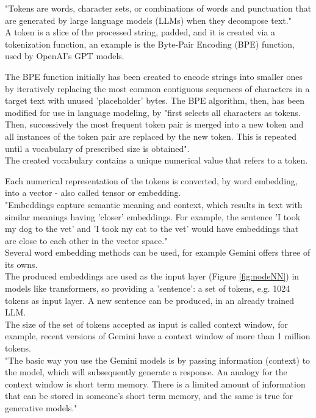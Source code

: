 \documentclass[12pt]{article}
\begin{document}
\vspace{2mm}

"Tokens are words, character sets, or combinations of words and punctuation that are generated by large language models (LLMs) when they decompose text."\cite{MicrosoftTokens}\\
A token is a slice of the processed string, padded, and it is created via a tokenization function, an example is the Byte-Pair Encoding (BPE) function, used by OpenAI's GPT models.

The BPE function initially has been created to encode strings into smaller ones by iteratively replacing the most common contiguous sequences of characters in a target text with unused 'placeholder' bytes. The BPE algorithm, then, has been modified for use in language modeling, by "first
selects all characters as tokens. Then, successively the most frequent token pair is
merged into a new token and all instances of the token pair are replaced by the
new token. This is repeated until a vocabulary of prescribed size is obtained".\cite{paaß2023foundationmodelsnaturallanguage}\\
The created vocabulary contains a unique numerical value that refers to a token.\\

\vspace{2mm}

Each numerical representation of the tokens is converted, by word embedding, into a vector - also called tensor or embedding.\\
"Embeddings capture semantic meaning and context, which results in text with similar meanings having 'closer' embeddings. For example, the sentence 'I took my dog to the vet' and 'I took my cat to the vet' would have embeddings that are close to each other in the vector space."\cite{GoogleEmbeddings}\\
Several word embedding methods can be used, for example Gemini offers three of its owns.\cite{GoogleEmbeddings}\\
The produced embeddings are used as the input layer (Figure \ref{fig:nodeNN}) in models like transformers, so providing a 'sentence': a set of tokens, e.g. 1024 tokens as input layer. A new sentence can be produced, in an already trained LLM.\\ 
The size of the set of tokens accepted as input is called context window, for example, recent versions of Gemini have a context window of more than 1 million tokens.\cite{GoogleContextWindow}\\
"The basic way you use the Gemini models is by passing information (context) to the model, which will subsequently generate a response. An analogy for the context window is short term memory. There is a limited amount of information that can be stored in someone's short term memory, and the same is true for generative models."\cite{GoogleContextWindow}\\
\end{document}
